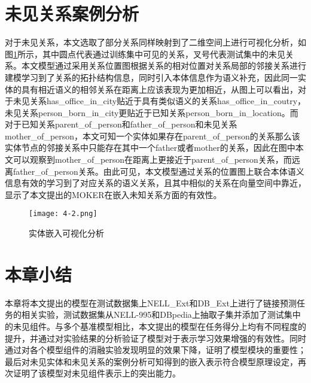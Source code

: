 \section{未见关系案例分析}
对于未见关系，本文选取了部分关系同样映射到了二维空间上进行可视化分析，如图\ref{fig:4-2}所示，其中圆点代表通过训练集中可见的关系，叉号代表测试集中的未见关系。本文模型通过采用关系位置图根据关系的相对位置对关系局部的邻接关系进行建模学习到了关系的拓扑结构信息，同时引入本体信息作为语义补充，因此同一实体的具有相近语义的相邻关系在距离上应该表现为更加相近，从图上可以看出，对于未见关系has\_office\_in\_city贴近于具有类似语义的关系has\_office\_in\_coutry，未见关系person\_born\_in\_city更贴近于已知关系person\_born\_in\_location。而对于已知关系parent\_of\_person和father\_of\_person和未见关系mother\_of\_person，本文可知一个实体如果存在parent\_of\_person的关系那么该实体节点的邻接关系中只能存在其中一个father或者mother的关系，因此在图中本文可以观察到mother\_of\_person在距离上更接近于parent\_of\_person关系，而远离father\_of\_person关系。由此可见，本文模型通过关系的位置图上联合本体语义信息有效的学习到了对应关系的语义关系，且其中相似的关系在向量空间中靠近，显示了本文提出的MOKER在嵌入未知关系方面的有效性。
\begin{figure}[h]
  \centering
  \texttt{[image: 4-2.png]}
  \caption{实体嵌入可视化分析}
  \label{fig:4-2}
\end{figure}

\section{本章小结}
本章将本文提出的模型在测试数据集上NELL\_Ext和DB\_Ext上进行了链接预测任务的相关实验，测试数据集从NELL-995和DBpedia上抽取子集并添加了测试集中的未见组件。与多个基准模型相比，本文提出的模型在任务得分上均有不同程度的提升，并通过对实验结果的分析验证了模型对于表示学习效果增强的有效性。同时通过对各个模型组件的消融实验发现明显的效果下降，证明了模型模块的重要性；最后对未见实体和未见关系的案例分析可知得到的嵌入表示符合模型原理设定，再次证明了该模型对未见组件表示上的突出能力。